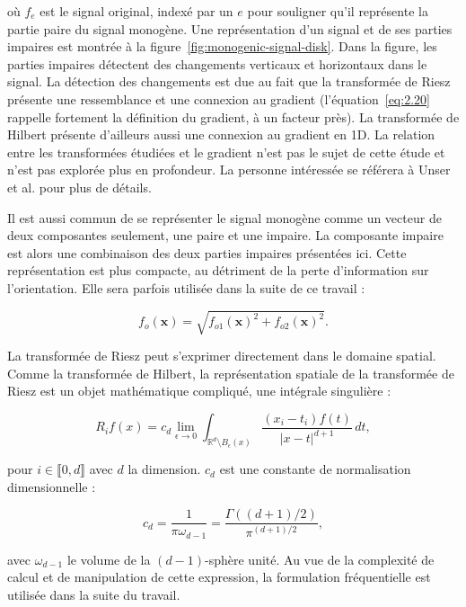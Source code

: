 où $f_e$ est le signal original, indexé par un $e$ pour souligner qu'il représente la partie paire du signal monogène. Une représentation d'un signal et de ses parties impaires est montrée à la figure~\ref{fig:monogenic-signal-disk}. Dans la figure, les parties impaires détectent des changements verticaux et horizontaux dans le signal. La détection des changements est due au fait que la transformée de Riesz présente une ressemblance et une connexion au gradient (l'équation~\ref{eq:2.20} rappelle fortement la définition du gradient, à un facteur près). La transformée de Hilbert présente d'ailleurs aussi une connexion au gradient en 1D. La relation entre les transformées étudiées et le gradient n'est pas le sujet de cette étude et n'est pas explorée plus en profondeur. La personne intéressée se référera à Unser et al.\cite{unser_multiresolution_2009} pour plus de détails.

\bigskip

Il est aussi commun de se représenter le signal monogène comme un vecteur de deux composantes seulement, une paire et une impaire. La composante impaire est alors une combinaison des deux parties impaires présentées ici. Cette représentation est plus compacte, au détriment de la perte d'information sur l'orientation. Elle sera parfois utilisée dans la suite de ce travail :

\begin{equation}
    f_o(\mathbf{x}) = \sqrt{f_{o1}(\mathbf{x})^2 + f_{o2}(\mathbf{x})^2}.
\end{equation}

La transformée de Riesz peut s'exprimer directement dans le domaine spatial. Comme la transformée de Hilbert, la représentation spatiale de la transformée de Riesz est un objet mathématique compliqué, une intégrale singulière :

\begin{equation}
    R_if(x) = c_d \lim_{\epsilon \to 0}\int_{\mathbb{R}^d\setminus B_\epsilon(x)}\frac{(x_i-t_i)f(t)}{|x-t|^{d+1}}\,dt,
    \label{eq:riesz-transform-spatial}
\end{equation}

pour $i\in\llbracket 0, d\rrbracket$ avec $d$ la dimension. $c_d$ est une constante de normalisation dimensionnelle :

\begin{equation}
    c_d = \frac1{\pi\omega_{d-1}} = \frac{\Gamma((d+1)/2)}{\pi^{(d+1)/2}},
\end{equation}

avec $\omega_{d-1}$ le volume de la $(d-1)$-sphère unité. Au vue de la complexité de calcul et de manipulation de cette expression, la formulation fréquentielle est utilisée dans la suite du travail.

